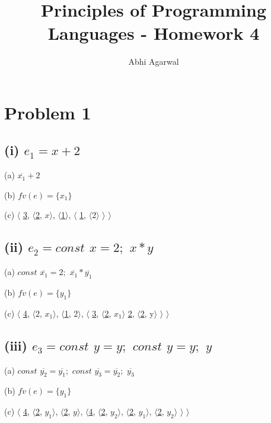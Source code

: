 \documentclass[11pt, oneside]{article}
\title{Principles of Programming Languages - Homework 4}
\author{Abhi Agarwal}
\date{}
\newcommand{\forceindent}{\leavevmode{\parindent=1.5em\indent}}
\begin{document}
\maketitle
\section{Problem 1}
\subsection*{(i) $e_1 = x + 2$}
\forceindent \par (a) $\overline{x_1} + 2$
\par (b) $fv (e) = \{x_1\}$
\par (c)
	$\langle$
		\uline{3},
		$\langle$\uline{2}, $x$$\rangle$,
		$\langle$\uline{1}$\rangle$,
		$\langle$
			\uline{1},
			$\langle$2$\rangle$
		$\rangle$
	$\rangle$

\subsection*{(ii) $e_2 = const$ $x = 2;$ $ x * y$}
\forceindent \par (a) $const$ $\overline{x_1} = 2;$ $ \overline{x_1} * \overline{y_1}$
\par (b) $fv (e) = \{y_1\}$
\par (c)
	$\langle$
		\uline{4},
		$\langle$2, $x_1$$\rangle$,
		$\langle$\uline{1}, 2$\rangle$,
		$\langle$
			\uline{3},
			$\langle$\uline{2}, $x_1$$\rangle$
			\uline{2},
			$\langle$\uline{2}, y$\rangle$
		$\rangle$
	$\rangle$

\subsection*{(iii) $e_3 = const$ $y = y;$ $const$ $y = y;$ $y$}
\forceindent \par (a) $const$ $\overline{y_2} = \overline{y_1};$ $const$ $\overline{y_3} = \overline{y_2};$ $\overline{y_3}$
\par (b) $fv (e) = \{y_1\}$
\par (c)
	$\langle$ 
		\uline{4},
		$\langle$\uline{2}, $y_1$$\rangle$,
		$\langle$\uline{2}, $y$$\rangle$,
		$\langle$\uline{4},
			$\langle$\uline{2}, $y_2$$\rangle$,
			$\langle$\uline{2}, $y_1$$\rangle$,
			$\langle$\uline{2}, $y_2$$\rangle$
		$\rangle$
	$\rangle$
\end{document}
